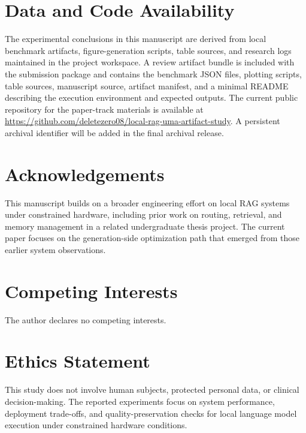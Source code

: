 \documentclass[10pt,twocolumn]{article}
\newif\ifanonymized
\begin{document}
\section*{Data and Code Availability}

The experimental conclusions in this manuscript are derived from local benchmark artifacts, figure-generation scripts, table sources, and research logs maintained in the project workspace. A review artifact bundle is included with the submission package and contains the benchmark JSON files, plotting scripts, table sources, manuscript source, artifact manifest, and a minimal README describing the execution environment and expected outputs. The current public repository for the paper-track materials is available at \url{https://github.com/deletezero08/local-rag-uma-artifact-study}. A persistent archival identifier will be added in the final archival release.

\section*{Acknowledgements}

\ifanonymized
Acknowledgements are omitted during anonymous review and will be restored in the camera-ready or non-anonymous submission version.
\else
This manuscript builds on a broader engineering effort on local RAG systems under constrained hardware, including prior work on routing, retrieval, and memory management in a related undergraduate thesis project. The current paper focuses on the generation-side optimization path that emerged from those earlier system observations.
\fi

\section*{Competing Interests}

The author declares no competing interests.

\section*{Ethics Statement}

This study does not involve human subjects, protected personal data, or clinical decision-making. The reported experiments focus on system performance, deployment trade-offs, and quality-preservation checks for local language model execution under constrained hardware conditions.



\end{document}
